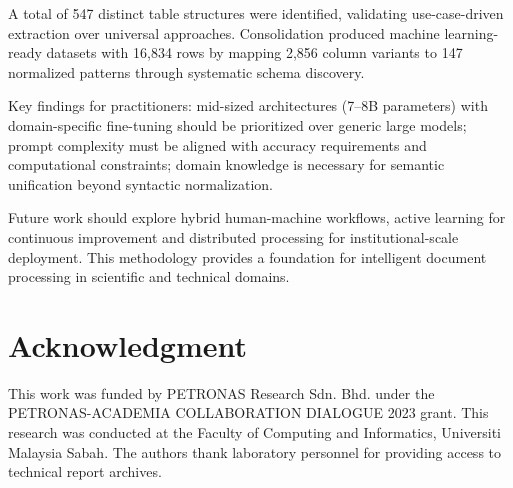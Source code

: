 \documentclass[conference]{IEEEtran}
\begin{document}
A total of 547 distinct table structures were identified, validating use-case-driven extraction over universal approaches. Consolidation produced machine learning-ready datasets with 16,834 rows by mapping 2,856 column variants to 147 normalized patterns through systematic schema discovery.

Key findings for practitioners: mid-sized architectures (7--8B parameters) with domain-specific fine-tuning should be prioritized over generic large models; prompt complexity must be aligned with accuracy requirements and computational constraints; domain knowledge is necessary for semantic unification beyond syntactic normalization.

Future work should explore hybrid human-machine workflows, active learning for continuous improvement and distributed processing for institutional-scale deployment. This methodology provides a foundation for intelligent document processing in scientific and technical domains.

\section*{Acknowledgment}

This work was funded by PETRONAS Research Sdn. Bhd. under the PETRONAS-ACADEMIA COLLABORATION DIALOGUE 2023 grant. This research was conducted at the Faculty of Computing and Informatics, Universiti Malaysia Sabah. The authors thank laboratory personnel for providing access to technical report archives.
\end{document}
